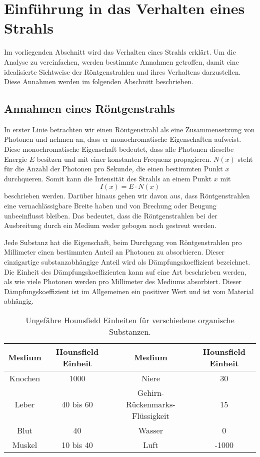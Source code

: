 %
%
%
%
\section{Einführung in das Verhalten eines Strahls
	\label{ct:section:EinführungEinesStrahls}}

Im vorliegenden Abschnitt wird das Verhalten eines Strahls erklärt. Um die Analyse zu vereinfachen, werden bestimmte Annahmen getroffen, damit eine idealisierte Sichtweise der Röntgenstrahlen und ihres Verhaltens darzustellen. Diese Annahmen werden im folgenden Abschnitt beschrieben.

\subsection{Annahmen eines Röntgenstrahls
	\label{ct:subsection:annahmen}}
In erster Linie betrachten wir einen Röntgenstrahl als eine Zusammensetzung von Photonen und nehmen an, dass er monochromatische Eigenschaften aufweist. Diese monochromatische Eigenschaft bedeutet, dass alle Photonen dieselbe Energie $E$ besitzen und mit einer konstanten Frequenz propagieren. $N(x)$ steht für die Anzahl der Photonen pro Sekunde, die einen bestimmten Punkt $x$ durchqueren. Somit kann die Intensität des Strahls an einem Punkt $x$ mit
\begin{equation}
	I(x) = E\cdot N(x)
\end{equation}
beschrieben werden. Darüber hinaus gehen wir davon aus, dass Röntgenstrahlen eine vernachlässigbare Breite haben und von Brechung oder Beugung unbeeinflusst bleiben. Das bedeutet, dass die Röntgenstrahlen bei der Ausbreitung durch ein Medium weder gebogen noch gestreut werden.

Jede Substanz hat die Eigenschaft, beim Durchgang von Röntgenstrahlen pro Millimeter einen bestimmten Anteil an Photonen zu absorbieren. Dieser einzigartige substanzabhängige Anteil wird als Dämpfungskoeffizient bezeichnet. Die Einheit des Dämpfungskoeffizienten kann auf eine Art beschrieben werden, als \glqq wie viele Photonen werden pro Millimeter des Mediums absorbiert\grqq. Dieser Dämpfungskoeffizient ist im Allgemeinen ein positiver Wert und ist vom Material abhängig.  
\begin{table}
	\centering
	\begin{tabular}{|>{}c<{}|>{}c<{}| >{}c<{}| >{}c<{}|}
		\hline
		Medium &  Hounsfield Einheit & Medium &  Hounsfield Einheit\\
		\hline
		Knochen & 1000		& Niere & 30\\
		Leber 	& 40 bis 60	& Gehirn-Rückenmarks-Flüssigkeit & 15\\
		Blut 	& 40		& Wasser & 0\\
		Muskel 	& 10 bis 40 & Luft & -1000\\
		\hline
	\end{tabular}
	\caption{Ungefähre Hounsfield Einheiten für verschiedene organische Substanzen.
		\label{ct:hounsfieldunits}}
\end{table}

